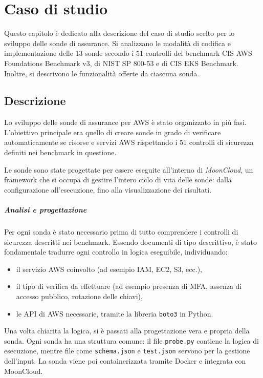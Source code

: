 \chapter{Caso di studio}
\label{cap:caso_studio}

Questo capitolo è dedicato alla descrizione del caso di studio scelto per lo sviluppo delle sonde di assurance. Si analizzano le modalità di codifica e implementazione delle 13 sonde secondo i 51 controlli del benchmark CIS AWS Foundations Benchmark v3, di NIST SP 800-53 e di CIS EKS Benchmark. Inoltre, si descrivono le funzionalità offerte da ciascuna sonda.

\section{Descrizione}

Lo sviluppo delle sonde di assurance per AWS è stato organizzato in più fasi. L'obiettivo principale era quello di creare sonde in grado di verificare automaticamente se risorse e servizi AWS rispettando i 51 controlli di sicurezza definiti nei benchmark in questione. 

Le sonde sono state progettate per essere eseguite all'interno di \textit{MoonCloud}, un framework che si occupa di gestire l'intero ciclo di vita delle sonde: dalla configurazione all'esecuzione, fino alla visualizzazione dei risultati.

\paragraph{Analisi e progettazione} Per ogni sonda è stato necessario prima di tutto comprendere i controlli di sicurezza descritti nei benchmark. Essendo documenti di tipo descrittivo, è stato fondamentale tradurre ogni controllo in logica eseguibile, individuando:
\begin{itemize}
    \item il servizio AWS coinvolto (ad esempio IAM, EC2, S3, ecc.),
    \item il tipo di verifica da effettuare (ad esempio presenza di MFA, assenza di accesso pubblico, rotazione delle chiavi),
    \item le API di AWS necessarie, tramite la libreria \texttt{boto3} in Python.
\end{itemize}

Una volta chiarita la logica, si è passati alla progettazione vera e propria della sonda. Ogni sonda ha una struttura comune: il file \texttt{probe.py} contiene la logica di esecuzione, mentre file come \texttt{schema.json} e \texttt{test.json} servono per la gestione dell'input. La sonda viene poi containerizzata tramite Docker e integrata con MoonCloud.

